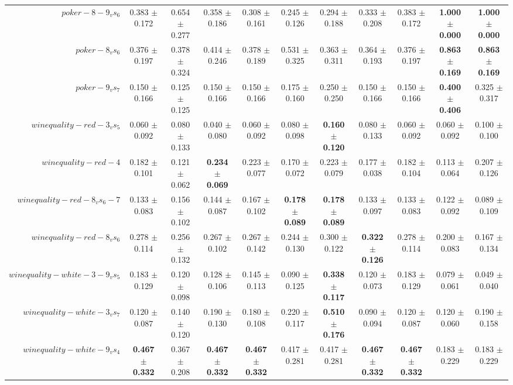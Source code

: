\begin{table}[!ht]
{\begin{tabular}{r c c c c c c c c c c}
$poker-8-9_vs_6$ & 0.383 $\pm$ 0.172 & 0.654 $\pm$ 0.277 & 0.358 $\pm$ 0.186 & 0.308 $\pm$ 0.161 & 0.245 $\pm$ 0.126 & 0.294 $\pm$ 0.188 & 0.333 $\pm$ 0.208 & 0.383 $\pm$ 0.172 & \textbf{1.000 $\pm$ 0.000} & \textbf{1.000 $\pm$ 0.000} \\
$poker-8_vs_6$ & 0.376 $\pm$ 0.197 & 0.378 $\pm$ 0.324 & 0.414 $\pm$ 0.246 & 0.378 $\pm$ 0.189 & 0.531 $\pm$ 0.325 & 0.363 $\pm$ 0.311 & 0.364 $\pm$ 0.193 & 0.376 $\pm$ 0.197 & \textbf{0.863 $\pm$ 0.169} & \textbf{0.863 $\pm$ 0.169} \\
$poker-9_vs_7$ & 0.150 $\pm$ 0.166 & 0.125 $\pm$ 0.125 & 0.150 $\pm$ 0.166 & 0.150 $\pm$ 0.166 & 0.175 $\pm$ 0.160 & 0.250 $\pm$ 0.250 & 0.150 $\pm$ 0.166 & 0.150 $\pm$ 0.166 & \textbf{0.400 $\pm$ 0.406} & 0.325 $\pm$ 0.317 \\
$winequality-red-3_vs_5$ & 0.060 $\pm$ 0.092 & 0.080 $\pm$ 0.133 & 0.040 $\pm$ 0.080 & 0.060 $\pm$ 0.092 & 0.080 $\pm$ 0.098 & \textbf{0.160 $\pm$ 0.120} & 0.080 $\pm$ 0.133 & 0.060 $\pm$ 0.092 & 0.060 $\pm$ 0.092 & 0.100 $\pm$ 0.100 \\
$winequality-red-4$ & 0.182 $\pm$ 0.101 & 0.121 $\pm$ 0.062 & \textbf{0.234 $\pm$ 0.069} & 0.223 $\pm$ 0.077 & 0.170 $\pm$ 0.072 & 0.223 $\pm$ 0.079 & 0.177 $\pm$ 0.038 & 0.182 $\pm$ 0.104 & 0.113 $\pm$ 0.064 & 0.207 $\pm$ 0.126 \\
$winequality-red-8_vs_6-7$ & 0.133 $\pm$ 0.083 & 0.156 $\pm$ 0.102 & 0.144 $\pm$ 0.087 & 0.167 $\pm$ 0.102 & \textbf{0.178 $\pm$ 0.089} & \textbf{0.178 $\pm$ 0.089} & 0.133 $\pm$ 0.097 & 0.133 $\pm$ 0.083 & 0.122 $\pm$ 0.092 & 0.089 $\pm$ 0.109 \\
$winequality-red-8_vs_6$ & 0.278 $\pm$ 0.114 & 0.256 $\pm$ 0.132 & 0.267 $\pm$ 0.102 & 0.267 $\pm$ 0.142 & 0.244 $\pm$ 0.130 & 0.300 $\pm$ 0.122 & \textbf{0.322 $\pm$ 0.126} & 0.278 $\pm$ 0.114 & 0.200 $\pm$ 0.083 & 0.167 $\pm$ 0.134 \\
$winequality-white-3-9_vs_5$ & 0.183 $\pm$ 0.129 & 0.120 $\pm$ 0.098 & 0.128 $\pm$ 0.106 & 0.145 $\pm$ 0.113 & 0.090 $\pm$ 0.125 & \textbf{0.338 $\pm$ 0.117} & 0.120 $\pm$ 0.073 & 0.183 $\pm$ 0.129 & 0.079 $\pm$ 0.061 & 0.049 $\pm$ 0.040 \\
$winequality-white-3_vs_7$ & 0.120 $\pm$ 0.087 & 0.140 $\pm$ 0.120 & 0.190 $\pm$ 0.130 & 0.180 $\pm$ 0.108 & 0.220 $\pm$ 0.117 & \textbf{0.510 $\pm$ 0.176} & 0.090 $\pm$ 0.094 & 0.120 $\pm$ 0.087 & 0.120 $\pm$ 0.060 & 0.190 $\pm$ 0.158 \\
$winequality-white-9_vs_4$ & \textbf{0.467 $\pm$ 0.332} & 0.367 $\pm$ 0.208 & \textbf{0.467 $\pm$ 0.332} & \textbf{0.467 $\pm$ 0.332} & 0.417 $\pm$ 0.281 & 0.417 $\pm$ 0.281 & \textbf{0.467 $\pm$ 0.332} & \textbf{0.467 $\pm$ 0.332} & 0.183 $\pm$ 0.229 & 0.183 $\pm$ 0.229 \\

\end{tabular}}
\end{table}
